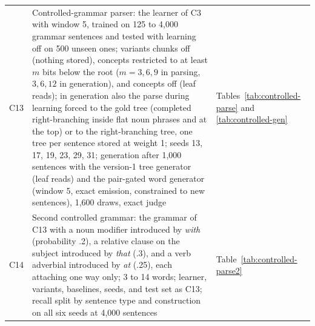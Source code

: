 \documentclass[11pt,letterpaper]{article}
\begin{document}
\begin{table}[h]
\begin{center}
\begin{tabular}{p{}p{}p{}}
C13 & Controlled-grammar parser: the learner of C3 with window 5, trained on 125 to 4,000 grammar sentences and tested with learning off on 500 unseen ones; variants chunks off (nothing stored), concepts restricted to at least $m$ bits below the root ($m = 3, 6, 9$ in parsing, $3, 6, 12$ in generation), and concepts off (leaf reads); in generation also the parse during learning forced to the gold tree (completed right-branching inside flat noun phrases and at the top) or to the right-branching tree, one tree per sentence stored at weight 1; seeds 13, 17, 19, 23, 29, 31; generation after 1,000 sentences with the version-1 tree generator (leaf reads) and the pair-gated word generator (window 5, exact emission, constrained to new sentences), 1,600 draws, exact judge & Tables~\ref{tab:controlled-parse} and \ref{tab:controlled-gen} \\
C14 & Second controlled grammar: the grammar of C13 with a noun modifier introduced by \emph{with} (probability .2), a relative clause on the subject introduced by \emph{that} (.3), and a verb adverbial introduced by \emph{at} (.25), each attaching one way only; 3 to 14 words; learner, variants, baselines, seeds, and test set as C13; recall split by sentence type and construction on all six seeds at 4,000 sentences & Table~\ref{tab:controlled-parse2} \\
\bottomrule
\end{tabular}
\end{center}
\end{table}
\end{document}
